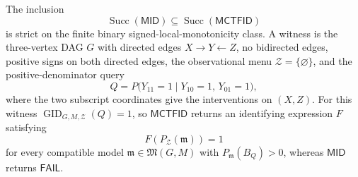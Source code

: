 The inclusion
\[
 \operatorname{Succ}(\mathsf{MID})
 \subseteq
 \operatorname{Succ}(\mathsf{MCTFID})
\]
is strict on the finite binary signed-local-monotonicity class.  A witness is the three-vertex DAG \(G\) with directed edges \(X\to Y\leftarrow Z\), no bidirected edges, positive signs on both directed edges, the observational menu \(\mathcal Z=\{\varnothing\}\), and the positive-denominator query
\[
 Q=P\bigl(Y_{11}=1\mid Y_{10}=1,\,Y_{01}=1\bigr),
\]
where the two subscript coordinates give the interventions on \((X,Z)\).  For this witness \(\operatorname{GID}_{G,M,\mathcal Z}(Q)=1\), so \(\mathsf{MCTFID}\) returns an identifying expression \(F\) satisfying
\[
 F(P_{\mathcal Z}(\mathfrak m))=1
\]
for every compatible model \(\mathfrak m\in\mathfrak M(G,M)\) with \(P_{\mathfrak m}(B_Q)>0\), whereas \(\mathsf{MID}\) returns \(\mathsf{FAIL}\).